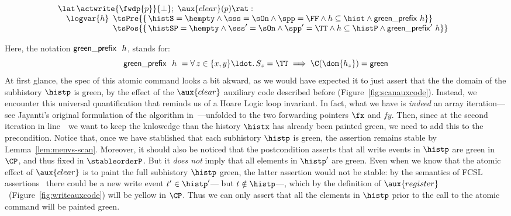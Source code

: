 \[
\!\begin{array}{l}
   \lat\,\actwrite{\fwdp{p}}{\bot};\ \aux{clear}(p)\rat :\\
   ~~~  \logvar{h}
   \begin{array}[t]{l}
     \tsPre{\{\, \histS = \hempty \wedge \sss= \sOn \wedge \spp = \FF
       \wedge h \subseteq \hist \wedge \greenH\ h \}}\\
     \tsPos{\{\, \histSP = \hempty \wedge \sss'= \sOn \wedge
       \spp' = \TT \wedge h \subseteq \histP \wedge \greenH'\ h\}}\\
   \end{array}
\end{array}
\]

Here, the notation  ${\mathsf{green\_prefix}}\ \ h$, stands for:
\begin{equation}
\label{eq:sss-prefix}
  \greenH\ \ h\ = \forall\, z \in \{x,y\}\ldot.\,
  \spz = \TT \implies \C(\dom{h_z}) = \mathsf{green} 
\end{equation}
At first glance, the spec of this atomic command looks a bit akward,
as we would have expected it to just assert that the the domain of the
subhistory $\histp$ is green, by the effect of the $\aux{clear}$
auxiliary code described before
(Figure~\ref{fig:scanauxcode}). Instead, we encounter this universal
quantification that reminds us of a Hoare Logic loop invariant. In
fact, what we have is \emph{indeed} an array iteration---see Jayanti's
original formulation of the algorithm
in~\cite{Jayanti+STOC05}---unfolded to the two forwarding pointers
$\fx$ and $fy$. Then, since at the second iteration in
line~\lineScanClearsY\ we want to keep the knlowedge than the history
$\histx$ has already been painted green, we need to add this to the
precondition. Notice that, once we have stablished that each
subhistory $\histp$ is green, the assertion remains stable by
Lemma~\ref{lem:menvs-scan}. Moreover, it should also be noticed that
the postcondition asserts that all write events in $\histp$ are green
in $\CP$, and thus fixed in $\stableorderP$. But it \emph{does not}
imply that all elements in $\histp'$ are green. Even when we know that
the atomic effect of $\aux{clear}$ is to paint the full subhistory
$\histp$ green, the latter assertion would not be stable: by the
semantics of FCSL assertions~\cite{NanevskiLSD+ESOP14} there could be
a new write event $t' \in \histp'$--- but $t \notin \histp$---, which
by the definition of $\aux{register}$~(Figure~\ref{fig:writeauxcode})
will be {\sf yellow} in $\CP$. Thus we can only assert that all the
elements in $\histp$ prior to the call to the atomic command will be
painted {\sf green}.



